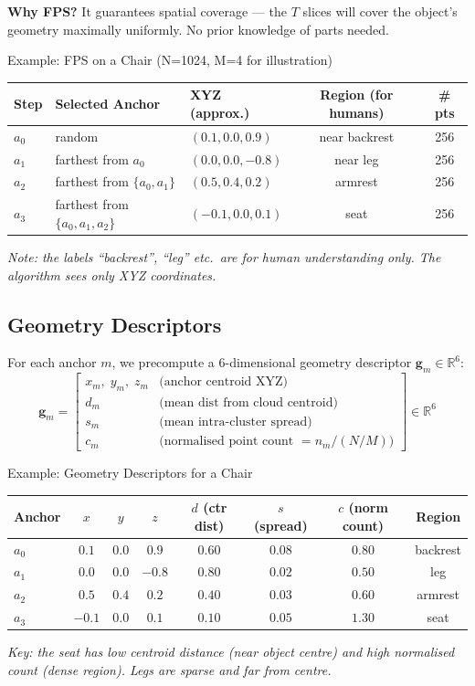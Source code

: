 \documentclass[11pt,a4paper]{article}
\begin{document}
\textbf{Why FPS?}  It guarantees spatial coverage --- the $T$ slices will cover
the object's geometry maximally uniformly.  No prior knowledge of parts needed.

\begin{examplebox}{Example: FPS on a Chair (N=1024, M=4 for illustration)}
\begin{center}
\begin{tabular}{lllcc}
\toprule
Step & Selected Anchor & XYZ (approx.) & Region (for humans) & \# pts \\
\midrule
$a_0$ & random & $(0.1, 0.0, 0.9)$ & near backrest & 256 \\
$a_1$ & farthest from $a_0$ & $(0.0, 0.0, -0.8)$ & near leg & 256 \\
$a_2$ & farthest from $\{a_0,a_1\}$ & $(0.5, 0.4, 0.2)$ & armrest & 256 \\
$a_3$ & farthest from $\{a_0,a_1,a_2\}$ & $(-0.1, 0.0, 0.1)$ & seat & 256 \\
\bottomrule
\end{tabular}
\end{center}
\emph{Note: the labels ``backrest'', ``leg'' etc.\ are for human understanding
only.  The algorithm sees only XYZ coordinates.}
\end{examplebox}

\subsection{Geometry Descriptors}

For each anchor $m$, we precompute a 6-dimensional geometry descriptor
$\mathbf{g}_m \in \mathbb{R}^6$:
\[
  \mathbf{g}_m = \begin{bmatrix}
    x_m,\; y_m,\; z_m & \text{(anchor centroid XYZ)} \\
    d_m & \text{(mean dist from cloud centroid)} \\
    s_m & \text{(mean intra-cluster spread)} \\
    c_m & \text{(normalised point count $= n_m / (N/M)$)}
  \end{bmatrix} \in \mathbb{R}^6
\]

\begin{examplebox}{Example: Geometry Descriptors for a Chair}
\begin{center}
\begin{tabular}{lccccccc}
\toprule
Anchor & $x$ & $y$ & $z$ & $d$ (ctr dist) & $s$ (spread) & $c$ (norm count) & Region \\
\midrule
$a_0$ & $0.1$ & $0.0$ & $0.9$ & $0.60$ & $0.08$ & $0.80$ & backrest \\
$a_1$ & $0.0$ & $0.0$ & $-0.8$ & $0.80$ & $0.02$ & $0.50$ & leg \\
$a_2$ & $0.5$ & $0.4$ & $0.2$ & $0.40$ & $0.03$ & $0.60$ & armrest \\
$a_3$ & $-0.1$ & $0.0$ & $0.1$ & $0.10$ & $0.05$ & $1.30$ & seat \\
\bottomrule
\end{tabular}
\end{center}
\emph{Key: the seat has low centroid distance (near object centre) and high
normalised count (dense region).  Legs are sparse and far from centre.}
\end{examplebox}
\end{document}
